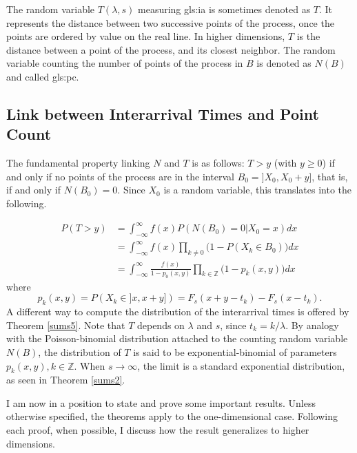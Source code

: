 \documentclass[10pt]{article}
\begin{document}
The random variable  $T(\lambda,s)$ measuring \gls{gls:ia} is sometimes denoted as $T$. It represents the distance between two successive points of the process, once the points are ordered by value on the real line. In higher dimensions, $T$ is the distance between a point of the process, and its closest neighbor. The random variable counting the number of points of the process in $B$ is denoted as $N(B)$ and called \gls{gls:pc}.
\subsection{Link between Interarrival Times and Point Count}\label{link20}

The fundamental property linking $N$ and $T$ is as follows: $T>y$ (with $y\geq 0$) if and only if no points of the process are in the interval $B_0=]X_0,X_0+y]$, that is, if and only if $N(B_0)=0$. Since $X_0$ is a random variable, this translates into the following.

\begin{align}
P(T>y) & =\int_{-\infty}^\infty f(x)P(N(B_0)=0 | X_0 = x) dx  \nonumber \\
 & =  \int_{-\infty}^\infty f(x)\prod_{k\neq 0}\Big(1-P(X_k\in B_0) \Big)dx \nonumber \\
 & =  \int_{-\infty}^\infty \frac{f(x)}{1-p_0(x,y)}\prod_{k\in\mathbb{Z}}\Big(1-p_k(x,y) \Big)dx \label{eq:1}
\end{align}
where
\begin{equation}
p_k(x,y) =P(X_k \in ]x, x+y])=F_s(x+y-t_k)-F_s(x-t_k). \label{eq:2}
\end{equation}
A different way to compute the distribution of the interarrival times is offered by Theorem \ref{sums5}. Note that $T$ depends on $\lambda$ and $s$, since $t_k=k/\lambda$. By analogy with the Poisson-binomial distribution attached to the counting random variable $N(B)$, the distribution of $T$ is said to be \textcolor{index}{exponential-binomial}  of parameters $p_k(x,y), k\in \mathbb{Z}$. When $s\rightarrow\infty$, the limit is a standard exponential distribution, as seen in Theorem \ref{sums2}.


\noindent I am now in a position to state and prove some important results. Unless otherwise specified, the theorems apply to the one-dimensional case. Following each proof, when possible, I discuss how the result generalizes to higher dimensions.

\end{document}
